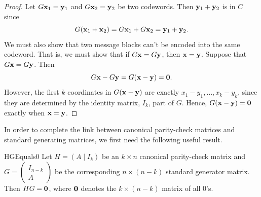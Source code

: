  \begin{proof}
Let $G {\bold x}_1 = {\bold y}_1$ and $G {\bold
x}_2 ={\bold y}_2$ be two codewords. Then ${\bold y}_1
+ {\bold y}_2$ is in $C$ since 
\[
G( {\bold x}_1 + {\bold x}_2)
=
G {\bold x}_1 + G {\bold x}_2
=
{\bold y}_1 + {\bold y}_2.
\]
We must also show that two message blocks  can't be encoded into the
same codeword. That is, we must show that if $G {\bold x} = G
{\bold y}$, then ${\bold x} = {\bold y}$.  Suppose that $G
{\bold x} = G {\bold y}$. Then
\[
G {\bold x} - G {\bold y}
=
G( {\bold x} - {\bold y})
=
{\bold 0}.
\]
However, the first $k$ coordinates in $G( {\bold x} - {\bold
y})$ are exactly $x_1 -y_1, \ldots, x_k - y_k$, since they are
determined by the identity matrix, $I_k$, part of $G$. Hence, $G(
{\bold x} - {\bold y}) = {\bold 0}$ exactly when
${\bold x} = {\bold y}$.
\end{proof}
 
 In order to complete the link between canonical parity-check
matrices and standard generating matrices, we first need the following useful result.
 
 \begin{prop}{HGEquals0}
Let $H = (A \mid I_k )$ be an $k \times n$ canonical parity-check
matrix and $G = \left(
 \begin{array}{c}
 I_{n-k} \\
A
 \end{array} \right)$ be the
corresponding $n \times (n-k)$ standard generator matrix. Then $HG =
{\bold 0}$, where  ${\bold 0}$ denotes the $k \times (n-k)$ matrix of all 0's.
\end{prop}
  

